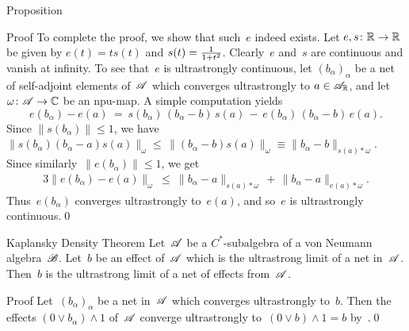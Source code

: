 \documentclass[a]{subfiles}
\begin{document}
\begin{parsec}
\begin{point}{Proposition}
\begin{point}{Proof}
To complete the proof,
we show that such~$e$ indeed exists.
Let $e,s\colon \mathbb{R}\to\mathbb{R}$ 
be given by $e(t)=ts(t)$ and $s(t)=\smash{\frac{1}{1+t^2}}$.
Clearly~$e$ and~$s$
are continuous
and
vanish at infinity.
To see that~$e$ is ultrastrongly continuous,
let $(b_\alpha)_\alpha$ be a net of self-adjoint elements of~$\mathscr{A}$
which converges ultrastrongly to $a\in\mathscr{A}_{\mathbb{R}}$,
and let~$\omega\colon \mathscr{A}\to \mathbb{C}$
be an npu-map. A simple computation yields
\begin{equation*}
e(b_\alpha)-e(a) \ =\ s(b_\alpha)\,(b_\alpha-b)\,s(a)
\,-\, e(b_\alpha)\,(b_\alpha-b)\,e(a).
\end{equation*}
Since $\|s(b_\alpha)\|\leq 1$,
we have $\|s(b_\alpha)(b_\alpha-a)s(a)\|_\omega 
\leq  \,\|(b_\alpha-b)s(a)\|_\omega
\equiv \|b_\alpha-b\|_{s(a)*\omega}$.
Since similarly~$\|e(b_\alpha)\|\leq 1$,
we get
\begin{alignat*}{3}
\|e(b_\alpha)-e(a)\|_\omega
\ \leq\ \|b_\alpha-a\|_{s(a)*\omega}\,+\,\|b_\alpha-a\|_{e(a)*\omega}.
\end{alignat*}
Thus~$e(b_\alpha)$ converges ultrastrongly to~$e(a)$,
and so~$e$ is ultrastrongly continuous.\qed
\end{point}
\end{point}

\begin{point}%
\end{point}
\begin{point}[kaplansky]{Kaplansky Density Theorem}%
Let~$\mathscr{A}$ be a $C^*$-subalgebra
of a von Neumann algebra~$\mathscr{B}$.
Let~$b$ be an effect of~$\mathscr{A}$ which is the ultrastrong limit
of a net in~$\mathscr{A}$.
Then~$b$ is the ultrastrong limit of a net of effects from~$\mathscr{A}$.
\begin{point}{Proof}%
Let~$(b_\alpha)_\alpha$
be a net in~$\mathscr{A}$ which converges ultrastrongly
to~$b$.
Then the effects  $(0\vee b_\alpha)\wedge 1$
of~$\mathscr{A}$ 
converge ultrastrongly to~$(0\vee b)\wedge 1 = b$
by~\TODO{}.\qed
\end{point}
\end{point}
\end{parsec}
\end{document}
